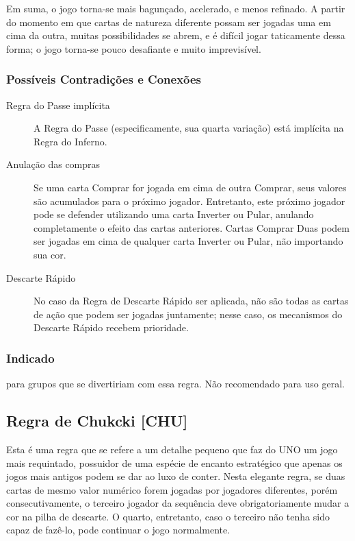 Em suma, o jogo torna-se mais bagunçado, acelerado, e menos refinado. A partir do momento em que cartas de natureza diferente possam ser jogadas uma em cima da outra, muitas possibilidades se abrem, e é difícil jogar taticamente dessa forma; o jogo torna-se pouco desafiante e muito imprevisível.

\subsubsection{Possíveis Contradições e Conexões}

\begin{description}
\item[Regra do Passe implícita]{A Regra do Passe (especificamente, sua quarta variação) está implícita na Regra do Inferno.}
\item[Anulação das compras]{Se uma carta Comprar for jogada em cima de outra Comprar, seus valores são acumulados para o próximo jogador. Entretanto, este próximo jogador pode se defender utilizando uma carta Inverter ou Pular, anulando completamente o efeito das cartas anteriores. Cartas Comprar Duas podem ser jogadas em cima de qualquer carta Inverter ou Pular, não importando sua cor.}
\item[Descarte Rápido]{No caso da Regra de Descarte Rápido ser aplicada, não são todas as cartas de ação que podem ser jogadas juntamente; nesse caso, os mecanismos do Descarte Rápido recebem prioridade.}
\end{description}

\subsubsection{Indicado} 

para grupos que se divertiriam com essa regra. Não recomendado para uso geral.

\subsection{Regra de Chukcki [CHU]}

Esta é uma regra que se refere a um detalhe pequeno que faz do UNO um jogo mais requintado, possuidor de uma espécie de encanto estratégico que apenas os jogos mais antigos podem se dar ao luxo de conter. Nesta elegante regra, se duas cartas de mesmo valor numérico forem jogadas por jogadores diferentes, porém consecutivamente, o terceiro jogador da sequência deve obrigatoriamente mudar a cor na pilha de descarte. O quarto, entretanto, caso o terceiro não tenha sido capaz de fazê-lo, pode continuar o jogo normalmente. 

